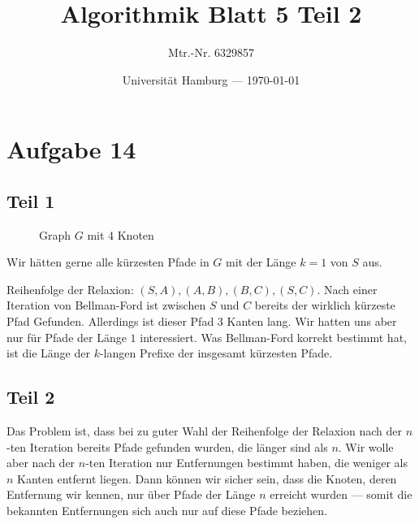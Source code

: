 \documentclass[parskip=half,a4paper]{scrartcl}
\title{Algorithmik Blatt 5 Teil 2}
\author{Mtr.-Nr. 6329857}
\date{Universität Hamburg --- \today}
\begin{document}
\maketitle %
\linenumbers

\section*{Aufgabe 14}

\subsection*{Teil 1}

\begin{figure}[H]
\center
{}
\caption{Graph $G$ mit 4 Knoten}
\end{figure}

Wir hätten gerne alle kürzesten Pfade in $G$ mit der Länge $k=1$ von $S$ aus.

Reihenfolge der Relaxion: $(S,A), (A,B), (B,C), (S,C)$. Nach einer Iteration von Bellman-Ford ist zwischen $S$ und $C$ bereits der wirklich kürzeste Pfad Gefunden. Allerdings ist dieser Pfad $3$ Kanten lang. Wir hatten uns aber nur für Pfade der Länge $1$ interessiert. Was Bellman-Ford korrekt bestimmt hat, ist die Länge der $k$-langen Prefixe der insgesamt kürzesten Pfade.

\subsection*{Teil 2}

Das Problem ist, dass bei zu guter Wahl der Reihenfolge der Relaxion nach der $n$-ten Iteration bereits Pfade gefunden wurden, die länger sind als $n$. Wir wolle aber nach der $n$-ten Iteration nur Entfernungen bestimmt haben, die weniger als $n$ Kanten entfernt liegen. Dann können wir sicher sein, dass die Knoten, deren Entfernung wir kennen, nur über Pfade der Länge $n$ erreicht wurden --- somit die bekannten Entfernungen sich auch nur auf diese Pfade beziehen.
\end{document}
